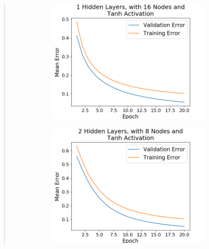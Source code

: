 \documentclass{article}
\begin{document}
\begin{quote}
\begin{figure}[h!]
\begin{subfigure}[h]{0.23\textwidth}
	\includegraphics[width=\textwidth]{figs/Cancer_Binary_Classification_1_Hidden_Layers_with_16_Nodes_and_Tanh_Activation.png}
\end{subfigure}
%
\begin{subfigure}[h]{0.23\textwidth}
	\includegraphics[width=\textwidth]{figs/Cancer_Binary_Classification_2_Hidden_Layers_with_8_Nodes_and_Tanh_Activation.png}
\end{subfigure}
%
\begin{subfigure}[h]{0.23\textwidth}

\end{subfigure}
\end{figure}
\end{quote}
\end{document}
